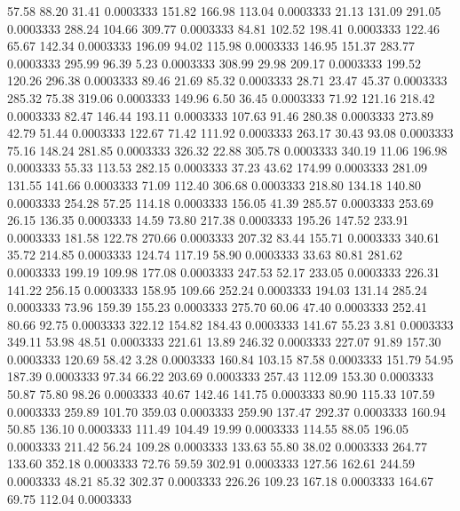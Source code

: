   57.58   88.20   31.41   0.0003333
 151.82  166.98  113.04   0.0003333
  21.13  131.09  291.05   0.0003333
 288.24  104.66  309.77   0.0003333
  84.81  102.52  198.41   0.0003333
 122.46   65.67  142.34   0.0003333
 196.09   94.02  115.98   0.0003333
 146.95  151.37  283.77   0.0003333
 295.99   96.39    5.23   0.0003333
 308.99   29.98  209.17   0.0003333
 199.52  120.26  296.38   0.0003333
  89.46   21.69   85.32   0.0003333
  28.71   23.47   45.37   0.0003333
 285.32   75.38  319.06   0.0003333
 149.96    6.50   36.45   0.0003333
  71.92  121.16  218.42   0.0003333
  82.47  146.44  193.11   0.0003333
 107.63   91.46  280.38   0.0003333
 273.89   42.79   51.44   0.0003333
 122.67   71.42  111.92   0.0003333
 263.17   30.43   93.08   0.0003333
  75.16  148.24  281.85   0.0003333
 326.32   22.88  305.78   0.0003333
 340.19   11.06  196.98   0.0003333
  55.33  113.53  282.15   0.0003333
  37.23   43.62  174.99   0.0003333
 281.09  131.55  141.66   0.0003333
  71.09  112.40  306.68   0.0003333
 218.80  134.18  140.80   0.0003333
 254.28   57.25  114.18   0.0003333
 156.05   41.39  285.57   0.0003333
 253.69   26.15  136.35   0.0003333
  14.59   73.80  217.38   0.0003333
 195.26  147.52  233.91   0.0003333
 181.58  122.78  270.66   0.0003333
 207.32   83.44  155.71   0.0003333
 340.61   35.72  214.85   0.0003333
 124.74  117.19   58.90   0.0003333
  33.63   80.81  281.62   0.0003333
 199.19  109.98  177.08   0.0003333
 247.53   52.17  233.05   0.0003333
 226.31  141.22  256.15   0.0003333
 158.95  109.66  252.24   0.0003333
 194.03  131.14  285.24   0.0003333
  73.96  159.39  155.23   0.0003333
 275.70   60.06   47.40   0.0003333
 252.41   80.66   92.75   0.0003333
 322.12  154.82  184.43   0.0003333
 141.67   55.23    3.81   0.0003333
 349.11   53.98   48.51   0.0003333
 221.61   13.89  246.32   0.0003333
 227.07   91.89  157.30   0.0003333
 120.69   58.42    3.28   0.0003333
 160.84  103.15   87.58   0.0003333
 151.79   54.95  187.39   0.0003333
  97.34   66.22  203.69   0.0003333
 257.43  112.09  153.30   0.0003333
  50.87   75.80   98.26   0.0003333
  40.67  142.46  141.75   0.0003333
  80.90  115.33  107.59   0.0003333
 259.89  101.70  359.03   0.0003333
 259.90  137.47  292.37   0.0003333
 160.94   50.85  136.10   0.0003333
 111.49  104.49   19.99   0.0003333
 114.55   88.05  196.05   0.0003333
 211.42   56.24  109.28   0.0003333
 133.63   55.80   38.02   0.0003333
 264.77  133.60  352.18   0.0003333
  72.76   59.59  302.91   0.0003333
 127.56  162.61  244.59   0.0003333
  48.21   85.32  302.37   0.0003333
 226.26  109.23  167.18   0.0003333
 164.67   69.75  112.04   0.0003333
